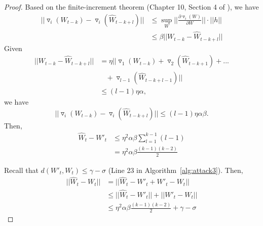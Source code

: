 \documentclass[conference]{IEEEtran}
\begin{document}
\begin{proof}
{Based\EndAccSupp{}} on the finite-increment theorem (Chapter 10, {Section\EndAccSupp{}} 4 of \cite{book-1469653}), we have
    \begin{equation*}
    \begin{aligned}
||\triangledown_i(W_{t-k}) - \triangledown_i(\hat{W}_{t-k+l})||&\leq \sup_{W}||\frac{\partial\triangledown_i(W)}{\partial W}||\cdot||h|| \\&\leq  \beta||W_{t-k}-\hat{W}_{t-k+l}||
\end{aligned}
   \end{equation*}
Given 
    \begin{equation*}
    \begin{aligned}
||W_{t-k}-\hat{W}_{t-k+l}|| &=\eta ||\triangledown_1(W_{t-k}) + \triangledown_2(\hat{W}_{t-k+1}) + ... \\ &~~~~+  \triangledown_{l-1}(\hat{W}_{t-k+l-1})|| \\ 
&\leq (l-1) \eta \alpha,
        \end{aligned}
   \end{equation*}
we have
$$||\triangledown_i(W_{t-k}) - \triangledown_i(\hat{W}_{t-k+l})|| \leq 
(l-1)\eta \alpha \beta.$$
Then,
\begin{equation*}
\begin{aligned}
          \hat{W}_t -W'_t  &\leq 
          \eta^2\alpha\beta\sum_{l=1}^{k-1}{(l-1)} \\
          &= \eta^2\alpha\beta \frac{(k-1)(k-2)}{2}
\end{aligned}
\end{equation*}

Recall that $d(W'_t,W_t) \leq \gamma - \sigma$ (Line 23 in Algorithm~\ref{alg:attack3}). 
Then, 
\begin{equation*}
\begin{aligned}
    ||\hat{W}_t-W_t|| &= ||\hat{W}_t-W'_t+W'_t-W_t||\\
    &\leq ||\hat{W}_t-W'_t|| + ||W'_t-W_t||\\
    &\leq \eta^2\alpha\beta \frac{(k-1)(k-2)}{2} + \gamma - \sigma
    \end{aligned}
\end{equation*}













\end{proof}
\end{document}
